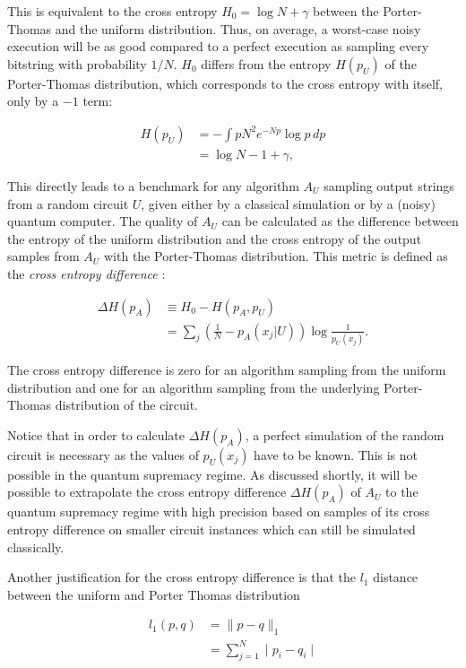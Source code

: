 This is equivalent to the cross entropy $H_0 = \log{N} + \gamma$ between the
Porter-Thomas and the uniform distribution. Thus, on
average, a worst-case noisy execution will be as good compared to a perfect execution as sampling
every bitstring with probability $1/N$. $H_0$ differs from the entropy $H(p_U)$ of
the Porter-Thomas distribution, which corresponds to the cross entropy with
itself, only by a $-1$ term:

\begin{align}
  H(p_U) &= - \int p N^2e^{-Np}\log{p} \, dp \\
         &= \log{N} -1 + \gamma,
\end{align}

This directly leads to a benchmark for any algorithm $A_U$ sampling output strings from a
random circuit $U$, given either by a
classical simulation or by a (noisy) quantum computer. The quality of 
$A_U$ can be calculated as the difference between
the entropy of the uniform distribution and the cross entropy of the output
samples from $A_U$ with the Porter-Thomas distribution. This metric is
defined as the \textit{cross entropy difference} \cite{Boixo2018supremacy}:

\begin{align}
  \Delta H(p_A) &\equiv H_0 - H(p_A, p_U) \\
                 &=\sum_j (\frac{1}{N} - p_A(x_j|U))\log{\frac{1}{p_U(x_j)}}.
\end{align}

The cross entropy difference is zero for an algorithm sampling from the uniform
distribution and one for an algorithm sampling from the underlying Porter-Thomas
distribution of the circuit.

Notice that in order to calculate $\Delta H(p_A)$, 
a perfect simulation of the random circuit is necessary as the values of $p_U(x_j)$ have to be known. This is not possible in the quantum
supremacy regime. As discussed shortly, it will be possible
to extrapolate the cross entropy difference $\Delta H(p_A)$ of $A_U$ to the quantum supremacy regime with high
precision based on samples of its cross entropy difference on smaller circuit
instances which can still be simulated classically.

Another justification for the cross entropy difference is that the $l_1$ distance between the uniform and Porter Thomas distribution

\begin{align}
  l_1(p,q) &= \| p-q\|_1 \\
           &= \sum_{j=1}^N \mid p_i - q_i \mid
\end{align}

